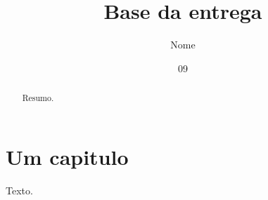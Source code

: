 \documentclass[dsc]{coppe}
\title{Base da entrega}
\author{Nome}{Sobrenome}
\date{09}{2026}
\begin{document}
  \maketitle
  \frontmatter
  \begin{abstract}Resumo.\end{abstract}
  \tableofcontents
  \mainmatter
  \chapter{Um capitulo}
  Texto.\nocite{m-diss}
  \printbibliography
\end{document}
